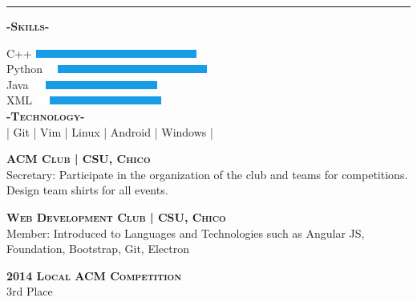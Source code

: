 \documentclass[12pt]{article}
\begin{document}
\noindent\rule{16.5cm}{0.4pt}
\bigskip
\begin{multicols}{2}
\begin{center}
\textbf{\textsc{-Skills-}}

\begin{small}
\end{small}
\flushleft
C++
\hfill
\includegraphics{C++Skill}\\
\smallskip
Python
\hfill
\includegraphics{PythonSkill}\\
\smallskip
Java
\hfill
\includegraphics{JavaSkill}\\
\smallskip
XML
\hfill
\includegraphics{JavaSkill}\\
\center
\textbf{\textsc{-Technology-}}\\
\smallskip
| Git | Vim | Linux | Android | Windows |

\end{center}

\columnbreak


\center
\footnotesize
\color{black}\textsc{\textbf{ACM Club | CSU, Chico}}\\
\flushleft
\color{Cerulean}Secretary: \color{gray} Participate in the organization of the club and teams for competitions. Design team shirts for all events.

\center
\color{black}\textsc{\textbf{Web Development Club | CSU, Chico}}\\
\flushleft
\color{Cerulean}Member: \color{gray}Introduced to Languages and Technologies such as Angular JS, Foundation, Bootstrap, Git, Electron

\center
\color{black}
\textbf{\textsc{2014 Local ACM Competition}}\\
\medskip
3rd Place






\end{multicols}
\end{document}
